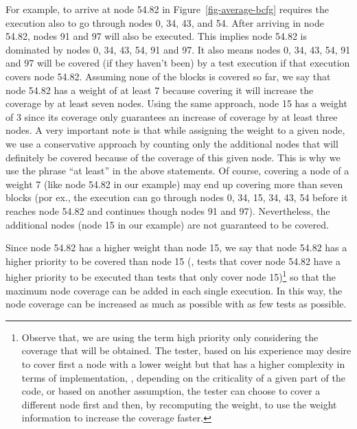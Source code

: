 For example, to arrive at node 54.82 in
Figure~\ref{fig-average-bcfg} requires the execution also to go
through nodes 0, 34, 43, and 54. After arriving in node 54.82,
nodes 91 and 97 will also be executed. This implies node 54.82 is
dominated by nodes 0, 34, 43, 54, 91 and 97. It also means nodes
0, 34, 43, 54, 91 and 97 will be covered (if they haven't been) by
a test execution if that execution covers node 54.82. Assuming
none of the blocks is covered so far, we say that node 54.82 has a
weight of at least 7 because covering it will increase the
coverage by at least seven nodes. Using the same approach, node 15
has a weight of 3 since its coverage only guarantees an increase
of coverage by at least three nodes. A very important note is that
while assigning the weight to a given node, we use a conservative
approach by counting only the additional nodes that will
definitely be covered because of the coverage of this given node.
This is why we use the phrase ``at least'' in the above
statements. Of course, covering a node of a weight 7 (like node
54.82 in our example) may end up covering more than seven blocks
(por ex., the execution can go through nodes 0, 34, 15, 34, 43, 54
before it reaches node 54.82 and continues though nodes 91 and
97). Nevertheless, the additional nodes (node 15 in our example)
are not guaranteed to be covered.





Since node 54.82 has a higher weight than node 15, we say that
node 54.82 has a higher priority to be covered than node 15 (\ie,
tests that cover node 54.82 have a higher priority to be executed
than tests that only cover node 15)\footnote{Observe that,
        we are using the term high priority only considering the
        coverage that will be obtained. The tester, based on his
        experience may desire to cover first a node with a lower weight
        but that has a higher complexity in terms of implementation, \ie,
        depending on the criticality of a given part of the code, or based on
        another assumption, the tester can choose to cover a different
        node first and then, by recomputing the weight, to use the weight
        information to increase the coverage faster.
} so that the maximum node coverage can be added in each single
execution. In this way, the node coverage can be increased as much
as possible with as few tests as possible.

